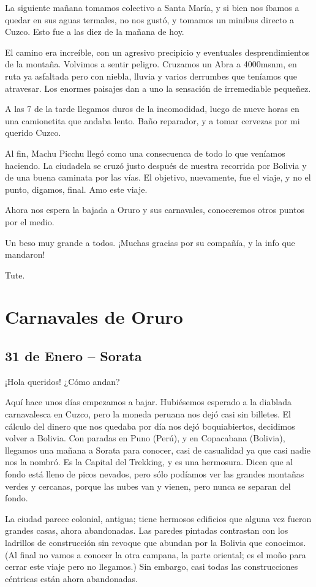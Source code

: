 La siguiente mañana tomamos colectivo a Santa María, y si bien nos íbamos a
quedar en sus aguas termales, no nos gustó, y tomamos un minibus directo a
Cuzco. Esto fue a las diez de la mañana de hoy.

El camino era increíble, con un agresivo precipicio y eventuales
desprendimientos de la montaña. Volvimos a sentir peligro. Cruzamos un Abra a
4000msnm, en ruta ya asfaltada pero con niebla, lluvia y varios derrumbes que
teníamos que atravesar. Los enormes paisajes dan a uno la sensación de
irremediable pequeñez.

A las 7 de la tarde llegamos duros de la incomodidad, luego de nueve horas en
una camionetita que andaba lento. Baño reparador, y a tomar cervezas por mi
querido Cuzco.

Al fin, Machu Picchu llegó como una consecuenca de todo lo que veníamos
haciendo. La ciudadela se cruzó justo después de nuestra recorrida por Bolivia
y de una buena caminata por las vías. El objetivo, nuevamente, fue el viaje, y
no el punto, digamos, final. Amo este viaje.

Ahora nos espera la bajada a Oruro y sus carnavales, conoceremos otros puntos
por el medio.

Un beso muy grande a todos. ¡Muchas gracias por su compañía, y
la info que mandaron!

Tute.

\section{Carnavales de Oruro} \subsection*{31 de Enero -- Sorata}

¡Hola queridos! ¿Cómo andan?

Aquí hace unos días empezamos a bajar. Hubiésemos esperado a la diablada
carnavalesca en Cuzco, pero la moneda peruana nos dejó casi sin billetes. El
cálculo del dinero que nos quedaba por día nos dejó boquiabiertos, decidimos
volver a Bolivia. Con paradas en Puno (Perú), y en Copacabana (Bolivia),
llegamos una mañana a Sorata para conocer, casi de casualidad ya que casi
nadie nos la nombró. Es la Capital del Trekking, y es una hermosura. Dicen que
al fondo está lleno de picos nevados, pero sólo podíamos ver las grandes
montañas verdes y cercanas, porque las nubes van y vienen, pero nunca se
separan del fondo.

La ciudad parece colonial, antigua; tiene hermosos edificios que alguna vez
fueron grandes casas, ahora abandonadas. Las paredes pintadas contrastan con los
ladrillos de construcción sin revoque que abundan por la Bolivia que conocimos.
(Al final no vamos a conocer la otra campana, la parte oriental; es el moño
para cerrar este viaje pero no llegamos.) Sin embargo, casi todas las
construcciones céntricas están ahora abandonadas.

